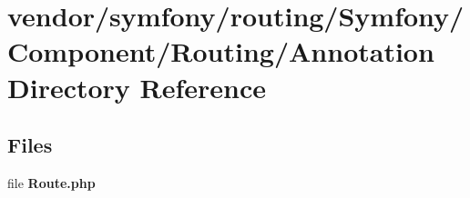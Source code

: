 \section{vendor/symfony/routing/\+Symfony/\+Component/\+Routing/\+Annotation Directory Reference}
\label{dir_f3eb8f47b560658c3bad2dd921fd4a40}
\subsection*{Files}
\begin{DoxyCompactItemize}
\item 
file {\bf Route.\+php}
\end{DoxyCompactItemize}
